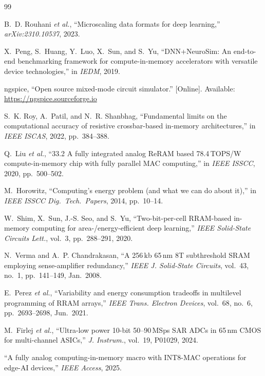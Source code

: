 \documentclass[conference,10pt]{IEEEtran}
\begin{document}
\begin{thebibliography}{99}
\balance

B.~D. Rouhani \emph{et al.}, ``Microscaling data formats for deep learning,''
\emph{arXiv:2310.10537}, 2023. %

X.~Peng, S.~Huang, Y.~Luo, X.~Sun, and S.~Yu, ``DNN+NeuroSim: An end-to-end
benchmarking framework for compute-in-memory accelerators with versatile device
technologies,'' in \emph{IEDM}, 2019.

ngspice, ``Open source mixed-mode circuit simulator.'' [Online]. Available:
\url{https://ngspice.sourceforge.io}

S.~K. Roy, A.~Patil, and N.~R. Shanbhag, ``Fundamental limits on the
computational accuracy of resistive crossbar-based in-memory architectures,''
in \emph{IEEE ISCAS}, 2022, pp.\ 384--388.

Q.~Liu \emph{et al.}, ``33.2 A fully integrated analog ReRAM based
78.4\,TOPS/W compute-in-memory chip with fully parallel MAC computing,'' in
\emph{IEEE ISSCC}, 2020, pp.\ 500--502.

M.~Horowitz, ``Computing's energy problem (and what we can do about it),'' in
\emph{IEEE ISSCC Dig.\ Tech.\ Papers}, 2014, pp.\ 10--14.

W.~Shim, X.~Sun, J.-S. Seo, and S.~Yu, ``Two-bit-per-cell RRAM-based in-memory
computing for area-/energy-efficient deep learning,'' \emph{IEEE Solid-State
Circuits Lett.}, vol.~3, pp.\ 288--291, 2020.

N.~Verma and A.~P. Chandrakasan, ``A 256\,kb 65\,nm 8T subthreshold SRAM
employing sense-amplifier redundancy,'' \emph{IEEE J. Solid-State Circuits},
vol.~43, no.~1, pp.\ 141--149, Jan.\ 2008.

E.~Perez \emph{et al.}, ``Variability and energy consumption tradeoffs in
multilevel programming of RRAM arrays,'' \emph{IEEE Trans. Electron Devices},
vol.~68, no.~6, pp.\ 2693--2698, Jun.\ 2021.

M.~Firlej \emph{et al.}, ``Ultra-low power 10-bit 50--90\,MSps SAR ADCs in
65\,nm CMOS for multi-channel ASICs,'' \emph{J. Instrum.}, vol.~19, P01029,
2024.

``A fully analog computing-in-memory macro with INT8-MAC operations for edge-AI
devices,'' \emph{IEEE Access}, 2025. %


\end{thebibliography}
\end{document}
